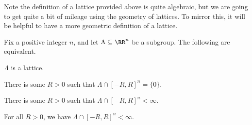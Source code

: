 \documentclass[../notes.tex]{subfiles}
\begin{document}
Note the definition of a lattice provided above is quite algebraic, but we are going to get quite a bit of mileage using the geometry of lattices. To mirror this, it will be helpful to have a more geometric definition of a lattice.
\begin{proposition} \label{prop:how-to-lattice}
	Fix a positive integer $n$, and let $\Lambda\subseteq\RR^n$ be a subgroup. The following are equivalent.
	\begin{listalph}
		\item $\Lambda$ is a lattice.
		\item There is some $R>0$ such that $\Lambda\cap[-R,R]^n=\{0\}$.
		\item There is some $R>0$ such that $\Lambda\cap[-R,R]^n<\infty$.
		\item For all $R>0$, we have $\Lambda\cap[-R,R]^n<\infty$.
	\end{listalph}
\end{proposition}
\end{document}
